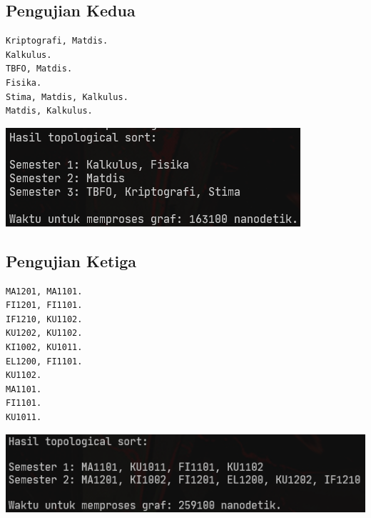 \documentclass{article}
\let\origfigure\figure
\let\endorigfigure\endfigure
\renewenvironment{figure}[1][2] {
    \expandafter\origfigure\expandafter[H]
} {
    \endorigfigure
}
\begin{document}
\subsection{Pengujian Kedua}
\begin{lstlisting}[caption = \textit{input}]
Kriptografi, Matdis.
Kalkulus.
TBFO, Matdis.
Fisika.
Stima, Matdis, Kalkulus.
Matdis, Kalkulus.
\end{lstlisting}


\begin{figure}
  \includegraphics[scale=0.8]{2.png}
  \caption{\textit{input}}
\end{figure}
\subsection{Pengujian Ketiga}
\begin{lstlisting}[caption = \textit{input}]
MA1201, MA1101.
FI1201, FI1101.
IF1210, KU1102.
KU1202, KU1102.
KI1002, KU1011.
EL1200, FI1101.
KU1102.
MA1101.
FI1101.
KU1011.
\end{lstlisting}


\begin{figure}
  \includegraphics[scale=0.8]{3.png}
  \caption{\textit{input}}
\end{figure}
\end{document}
